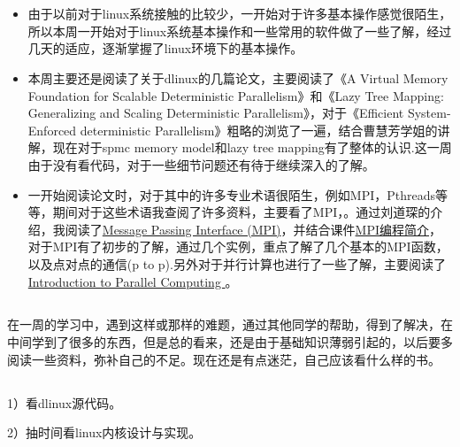 \section{}

\subsection{}

\begin{itemize}
\item{由于以前对于linux系统接触的比较少，一开始对于许多基本操作感觉很陌生，所以本周一开始对于linux系统基本操作和一些常用的软件做了一些了解，经过几天的适应，逐渐掌握了linux环境下的基本操作。}

\item{本周主要还是阅读了关于dlinux的几篇论文，主要阅读了《A Virtual Memory Foundation for Scalable Deterministic Parallelism》和《Lazy Tree Mapping: Generalizing and Scaling Deterministic Parallelism》，对于《Efficient System-Enforced deterministic Parallelism》粗略的浏览了一遍，结合曹慧芳学姐的讲解，现在对于spmc memory model和lazy tree mapping有了整体的认识.这一周由于没有看代码，对于一些细节问题还有待于继续深入的了解。}

\item{一开始阅读论文时，对于其中的许多专业术语很陌生，例如MPI，Pthreads等等，期间对于这些术语我查阅了许多资料，主要看了MPI，。通过刘道琛的介绍，我阅读了\href{https://computing.llnl.gov/tutorials/mpi/}{Message Passing Interface (MPI)}，并结合课件\href{https://http://wenku.baidu.com/view/ee8bf3390912a216147929f3.html}{MPI编程简介}，对于MPI有了初步的了解，通过几个实例，重点了解了几个基本的MPI函数，以及点对点的通信(p to p).另外对于并行计算也进行了一些了解，主要阅读了\href{https://computing.llnl.gov/tutorials/parallel_comp/}{Introduction to  Parallel Computing 
}。}
\end{itemize}

\subsection{}

在一周的学习中，遇到这样或那样的难题，通过其他同学的帮助，得到了解决，在中间学到了很多的东西，但是总的看来，还是由于基础知识薄弱引起的，以后要多阅读一些资料，弥补自己的不足。现在还是有点迷茫，自己应该看什么样的书。

\subsection{}
1）看dlinux源代码。

2）抽时间看linux内核设计与实现。


